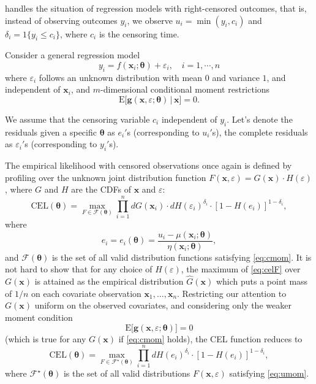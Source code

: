 \documentclass[article]{jss}
\renewcommand{\|}{\,|\,}
\begin{document}
 handles the situation of regression models with right-censored outcomes, that is, instead of observing outcomes \(y_i\), we observe \(u_i = \min(y_i, c_i)\) and \(\delta_i = \mathfrak 1\{y_i \le c_i\}\), where \(c_i\) is the censoring time.

Consider a general regression model
\[
  y_i = f(\bm x_i; \bm \theta) + \varepsilon_i, \quad i=1,\cdots,n
\]
where \(\varepsilon_i\) follows an unknown distribution with mean \(0\) and variance \(1\), and independent of \(\bm x_i\), and \(m\)-dimensional conditional moment restrictions
\begin{equation}\label{eq:cmom}
  \textrm{E}\bigl[\bm g(\bm x, \varepsilon; \bm \theta) \,|\, \bm x\bigr] = 0.
\end{equation}

We assume that the censoring variable \(c_i\) independent of \(y_i\). Let's denote the residuals given a specific \(\bm \theta\) as \(e_i'\)s (corresponding to \(u_i'\)s), the complete residuals as \(\varepsilon_i'\)s (corresponding to \(y_i'\)s).

The empirical likelihood with censored observations once again is defined by profiling over the unknown joint distribution function \(F(\bm x,\varepsilon) = G(\bm x) \cdot H(\varepsilon)\), where \(G\) and \(H\) are the CDFs of \(\bm x\) and \(\varepsilon\):
\begin{equation}\label{eq:celF}
  \textrm{CEL}(\bm \theta) = \max_{F \in \mathcal F(\bm \theta)}\prod_{i=1}^n dG(\bm x_i) \cdot dH(\varepsilon_i)^{\delta_i} \cdot [1- H(e_i)]^{1-\delta_i},
\end{equation}
where
\[
  e_i = e_i(\bm \theta) = \frac{u_i - \mu(\bm x_i;\bm \theta)}{\eta(\bm x_i;\bm \theta)},
\]
and \(\mathcal F(\bm \theta)\) is the set of all valid distribution functions satisfying \eqref{eq:cmom}. It is not hard to show that for any choice of \(H(\varepsilon)\), the maximum of \eqref{eq:celF} over \(G(\bm x)\) is attained as the empirical distribution \(\hat G(\bm x)\) which puts a point mass of \(1/n\) on each covariate observation \(\bm x_1, \ldots, \bm x_n\). Restricting our attention to \(G(\bm x)\) uniform on the observed covariates, and considering only the weaker moment condition
\begin{equation}\label{eq:umom}
  \textrm{E}\bigl[\bm g(\bm x, \varepsilon; \bm \theta)\bigr] = 0
\end{equation}
(which is true for any \(G(\bm x)\) if \eqref{eq:cmom} holds), the CEL function reduces to
\[
  \textrm{CEL}(\bm \theta) = \max_{F \in \mathcal F^\star(\bm \theta)}\prod_{i=1}^n dH(e_i)^{\delta_i} \cdot [1- H(e_i)]^{1-\delta_i},
\]
where \(\mathcal F^\star(\bm \theta)\) is the set of all valid distributions \(F(\bm x, \varepsilon)\) satisfying \eqref{eq:umom}.
\end{document}
